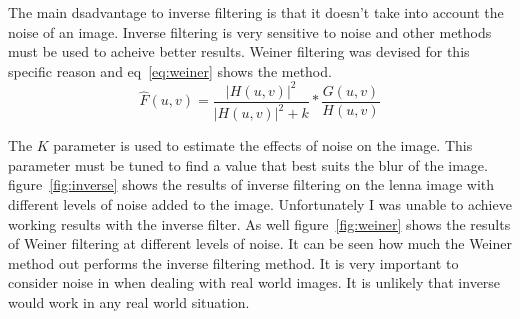 \documentclass[letterpaper]{article}
\begin{document}
The main dsadvantage to inverse filtering is that it doesn't take into account the noise of an image. Inverse filtering is very sensitive to noise and other methods must be used to acheive better results. Weiner filtering was devised for this specific reason and eq~\ref{eq:weiner} shows the method. 
\begin{equation} \label{eq:weiner}
\hat{F}(u,v)=\frac{|H(u,v)|^2}{|H(u,v)|^2 +k} * \frac{G(u,v)}{H(u,v)}
\end{equation}

The $K$ parameter is used to estimate the effects of noise on the image. This parameter must be tuned to find a value that best suits the blur of the image. figure~\ref{fig:inverse} shows the results of inverse filtering on the lenna image with different levels of noise added to the image. Unfortunately I was unable to achieve working results with the inverse filter. As well figure~\ref{fig:weiner} shows the results of Weiner filtering at different levels of noise. It can be seen how much the Weiner method out performs the inverse filtering method. It is very important to consider noise in when dealing with real world images. It is unlikely that inverse would work in any real world situation.
\end{document}
